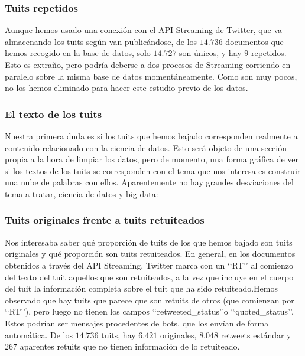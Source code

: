 \subsubsection{Tuits repetidos}
Aunque hemos usado una conexión con el API Streaming de Twitter, que va almacenando los
tuits según van publicándose,  de los $14.736$ documentos que hemos recogido en la base de datos, 
solo $14.727$ son únicos, y hay $9$ repetidos. Esto es extraño, pero podría deberse a dos procesos
de Streaming corriendo en paralelo sobre la misma base de datos momentáneamente. Como son muy pocos, no los hemos eliminado para hacer este estudio previo de los datos.

\subsubsection{El texto de los tuits}
Nuestra primera duda es si los tuits que hemos bajado corresponden realmente a contenido relacionado
con la ciencia de datos. Esto será objeto de una sección propia a la hora de limpiar los datos,
pero de momento, una forma gráfica de ver si los textos de los tuits se corresponden con el tema
que nos interesa es construir una nube de palabras con ellos. 
Aparentemente no hay grandes desviaciones del tema a tratar, ciencia de datos y big data:




\subsubsection{Tuits originales frente a tuits retuiteados}
Nos interesaba saber qué proporción de tuits de los que hemos bajado son tuits originales
y qué proporción son tuits retuiteados. En general, en los documentos obtenidos a través
del API Streaming, Twitter marca con un \lq\lq RT\rq\rq
al comienzo del texto del tuit aquellos que son retuiteados, a la vez que incluye en el cuerpo del
tuit la información completa sobre el tuit que ha sido retuiteado.Hemos observado
que hay tuits que parece que son retuits de otros (que comienzan por  \lq\lq RT\rq\rq), pero luego
no tienen los campos \lq\lq retweeted\_status\rq\rq o \lq\lq quoted\_status\rq\rq. Estos podrían ser 
mensajes procedentes de bots, que los envían de forma automática. De los $14.736$ tuits,  hay 
$6.421$ originales, $8.048$ retweets estándar y $267$ aparentes retuits que no tienen información
de lo retuiteado.

